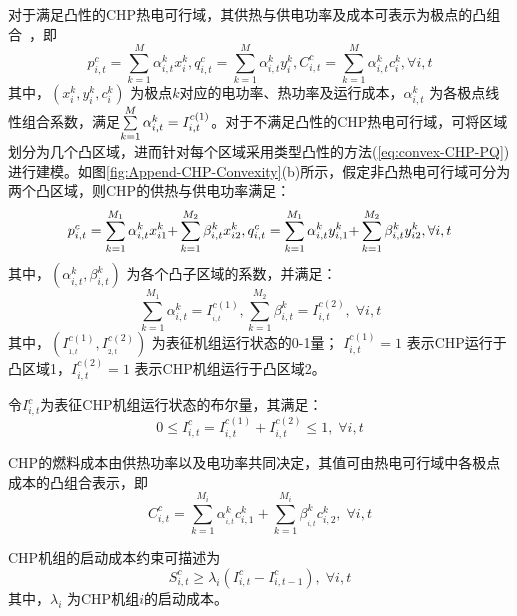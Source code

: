 对于满足凸性的CHP热电可行域，其供热与供电功率及成本可表示为极点的凸组合~\cite{CHP-Model-03, CHP-Model-CXY-15,IES-Model-CXY-18}，即
\begin{equation}
\label{eq:convex-CHP-PQ}
p_{i,t}^c = \sum\limits_{k = 1}^M {\alpha _{i,t}^kx_i^k,q_{i,t}^c = \sum\limits_{k = 1}^M {\alpha _{i,t}^ky_i^k} ,C_{i,t}^c = \sum\limits_{k = 1}^M {\alpha _{i,t}^kc_i^k} }, \forall i,t
\end{equation}
其中，$(x_i^k,y_i^k,c_i^k)$ 为极点$k$对应的电功率、热功率及运行成本，$\alpha _{i,t}^k$ 为各极点线性组合系数，满足$\sum\limits_{k{\rm{ = }}1}^M {\alpha _{i,t}^k}  = I_{i,t}^{c(1)}$。对于不满足凸性的CHP热电可行域，可将区域划分为几个凸区域，进而针对每个区域采用类型凸性的方法(\ref{eq:convex-CHP-PQ})进行建模。如图\ref{fig:Append-CHP-Convexity}(b)所示，假定非凸热电可行域可分为两个凸区域，则CHP的供热与供电功率满足：
\begin{equation}
\label{eq:non-convex-CHP-PQ}
p_{i,t}^c = \sum\limits_{k = 1}^{{M_1}} {\alpha _{i,t}^kx_{i1}^k} {\rm{ + }}\sum\limits_{k = 1}^{{M_2}} {\beta _{i,t}^kx_{i2}^k} ,q_{i,t}^c = \sum\limits_{k = 1}^{{M_1}} {\alpha _{i,t}^ky_{i,1}^k} {\rm{ + }}\sum\limits_{k = 1}^{{M_2}} {\beta _{i,t}^ky_{i2}^k}, \forall i,t
\end{equation}
其中，$(\alpha _{i,t}^k,\beta _{i,t}^k)$ 为各个凸子区域的系数，并满足：
\begin{equation}
\sum\limits_{k = 1}^{{M_1}} {\alpha _{i,t}^k}  = I_{_{i,t}}^{c(1)},\sum\limits_{k = 1}^{{M_2}} {\beta _{i,t}^k}  = I_{i,t}^{c(2)},\;\forall i,t
\end{equation}
其中，$(I_{_{1,t}}^{c(1)},I_{_{2,t}}^{c(2)})$ 为表征机组运行状态的0-1量； $I_{i,t}^{c(1)} = 1$ 表示CHP运行于凸区域1，$I_{i,t}^{c(2)} = 1$ 表示CHP机组运行于凸区域2。

令$I_{i,t}^c$为表征CHP机组运行状态的布尔量，其满足：
\begin{equation}
0 \le I_{i,t}^c = I_{i,t}^{c(1)} + I_{i,t}^{c(2)} \le 1, \; \forall i, t
\end{equation}

CHP的燃料成本由供热功率以及电功率共同决定，其值可由热电可行域中各极点成本的凸组合表示，即
\begin{equation}
C_{i,t}^c = \sum\limits_{k = 1}^{{M_i}} {\alpha _{_{i,t}}^kc_{i,1}^k}  + \sum\limits_{k = 1}^{{M_i}} {\beta _{_{i,t}}^kc_{i,2}^k}, \; \forall i,t
\end{equation}

CHP机组的启动成本约束可描述为
\begin{equation}
S_{i,t}^c \ge {\lambda _i}(I_{i,t}^c - I_{i,t - 1}^c), \; \forall i,t
\end{equation}
其中，$\lambda _i$ 为CHP机组$i$的启动成本。

